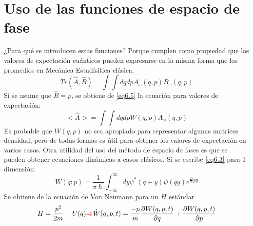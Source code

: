 \documentclass{book}
\begin{document}
\section{Uso de las funciones de espacio de fase}
¿Para qué se introducen estas funciones? Porque cumplen como propiedad que los valores de expectación cuánticos pueden expresarse en la misma forma que los promedios en Mecánica Estadísitica clásica. \begin{equation}\label{eq6.5} Tr(\hat{A},\hat{B})=\int\int dq dp A_\omega(q,p)B_\omega(q,p)\end{equation}
Si se asume que $\hat{B}=\rho$, se obtiene de \ref{eq6.5} la ecuación para valores de expectación:
 \begin{equation}\label{eq6.6} <\hat{A}>=\int\int dq dp W(q,p)A_\omega(q,p)\end{equation}
 Es probable que $W(q,p)$ no sea apropiado para representar algunas matrices densidad, pero de todas formas es útil para obtener los valores de expectación en varios casos.
 Otra utilidad del uso del método de espacio de fases es que se pueden obtener ecuaciones dinámicas a casos clásicos. Si se escribe \ref{eq6.3} para 1 dimensión:
 \begin{equation}\label{eq6.7}W(q;p)=\frac{1}{\pi\hslash} \int_{-\infty}^\infty dy \psi^*(q+y)\psi(qy)e^{\frac{2i}{\hslash}py}\end{equation}
 Se obtiene de la ecuación de Von Neumann para un $H$ estándar 
 \begin{equation}\label{eq6.8}H=\frac{p^2}{2m}+U(q)\textcolor{red}{\Rightarrow} \dot{W}(q,p,t)=\frac{-p}{m}\frac{\partial W(q,p,t)}{\partial q}+\frac{\partial W(q,p,t)}{\partial p}\end{equation}
\end{document}
